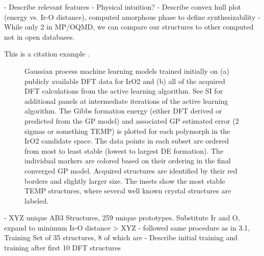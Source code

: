 

- Describe relevant features
  - Physical intuition?
- Describe convex hull plot (energy vs. Ir-O distance), computed amorphous phase to define synthesizability
- While only 2  in MP/OQMD, we can compare our structures to other computed  not in open databases.


This is a citation example \cite{dummy9999}.

\begin{figure}
\centering
{}
\caption{\label{fig:convergence_plot_iro2_0}
Gaussian process machine learning models trained initially on (a) publicly available DFT data for IrO2 and (b) all of the acquired DFT calculations from the active learning algorithm.
See SI for additional panels at intermediate iterations of the active learning algorithm.
The Gibbs formation energy (either DFT derived or predicted from the GP model) and associated GP estimated error (2 sigmas or something TEMP) is plotted for each polymorph in the IrO2 candidate space.
The data points in each subset are ordered from most to least stable (lowest to largest DE formation).
The individual markers are colored based on their ordering in the final converged GP model.
Acquired structures are identified by their red borders and slightly larger size.
The insets show the most stable TEMP structures, where several well known crystal structures are labeled.
}
\end{figure}


- XYZ unique AB3 Structures, 259 unique prototypes.  Substitute Ir and O, expand to minimum Ir-O distance > XYZ
- followed same procedure as in 3.1, Training Set of 35 structures, 8 of which are 
- Describe initial training and training after first 10 DFT structures


